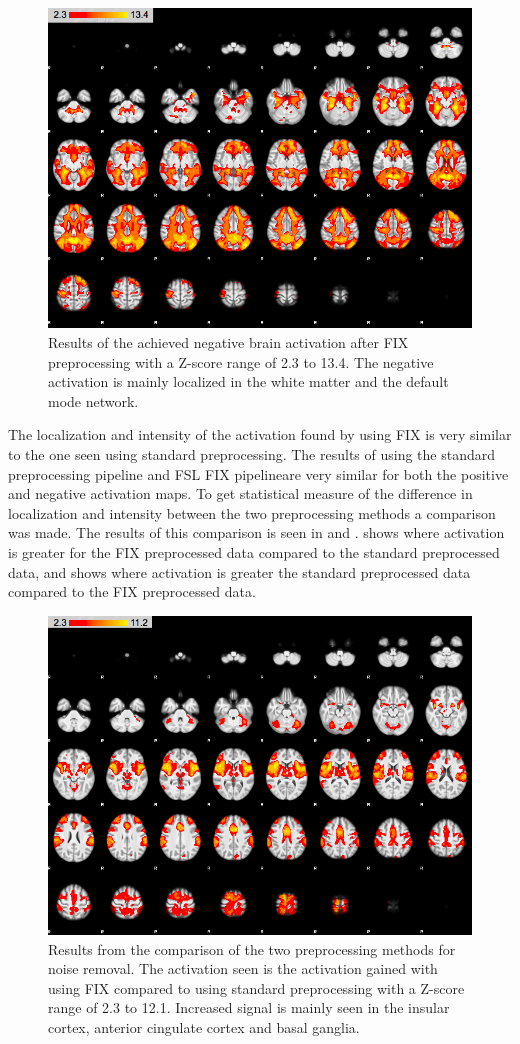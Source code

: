 \begin{figure}[H]                 
	\includegraphics[width=.65\textwidth]{figures/Results/FIX_neg}  
	\caption{Results of the achieved negative brain activation after FIX preprocessing with a Z-score range of 2.3 to 13.4. The negative activation is mainly localized in the white matter and the default mode network.}
	\label{fig:res:FIXneg} 
\end{figure}

The localization and intensity of the activation found by using FIX is very similar to the one seen using standard preprocessing. %
The results of using the standard preprocessing pipeline and FSL FIX pipelineare very similar for both the positive and negative activation maps.   
To get statistical measure of the difference in localization and intensity between the two preprocessing methods a comparison was made. The results of this comparison is seen in  and .  shows where activation is greater for the FIX preprocessed data compared to the standard preprocessed data, and  shows where activation is greater the standard preprocessed data compared to the FIX preprocessed data.

\begin{figure}[H]                 
	\includegraphics[width=.65\textwidth]{figures/Results/diff_pos}  
	\caption{Results from the comparison of the two preprocessing methods for noise removal. The activation seen is the activation gained with using FIX compared to using standard preprocessing with a Z-score range of 2.3 to 12.1. Increased signal is mainly seen in the insular cortex, anterior cingulate cortex and basal ganglia.}
	\label{fig:res:diff_pos} 
\end{figure}

